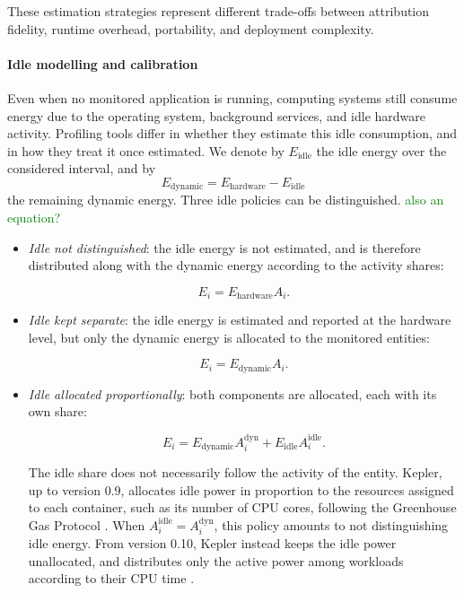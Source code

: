 \documentclass[
  acmsmall,
  screen,
  review,
  xcolor={dvipsnames,usenames}
]{acmart}
\newcommand{\iness}[1]{\textcolor{green}{#1}}
\begin{document}
These estimation strategies represent different trade-offs between attribution fidelity, runtime overhead, portability, and deployment complexity.

\paragraph{\textbf{Idle modelling and calibration}} \label{sec:idle-modelling}

Even when no monitored application is running, computing systems still consume energy due to the operating system, background services, and idle hardware activity. Profiling tools differ in whether they estimate this idle consumption, and in how they treat it once estimated. We denote by $E_{\mathrm{idle}}$ the idle energy over the considered interval, and by
\[
E_{\mathrm{dynamic}} = E_{\mathrm{hardware}} - E_{\mathrm{idle}}
\]
the remaining dynamic energy. Three idle policies can be distinguished.
\iness{also an equation?}
\begin{itemize}

\item \emph{Idle not distinguished}: the idle energy is not estimated, and is therefore distributed along with the dynamic energy according to the activity shares:

\begin{equation}
E_i = E_{\mathrm{hardware}} A_i.
\end{equation}

\item \emph{Idle kept separate}: the idle energy is estimated and reported at the hardware level, but only the dynamic energy is allocated to the monitored entities:

\begin{equation}
E_i = E_{\mathrm{dynamic}} A_i.
\end{equation}

\item \emph{Idle allocated proportionally}: both components are allocated, each with its own share:

\begin{equation}
E_i =
E_{\mathrm{dynamic}}A_i^{\mathrm{dyn}}
+
E_{\mathrm{idle}}A_i^{\mathrm{idle}}.
\end{equation}

The idle share does not necessarily follow the activity of the entity. Kepler, up to version 0.9, allocates idle power in proportion to the resources assigned to each container, such as its number of CPU cores, following the Greenhouse Gas Protocol \cite{cncfExploringKeplersPotentials2023,bellalInvestigatingPotentialKepler}. When $A_i^{\mathrm{idle}} = A_i^{\mathrm{dyn}}$, this policy amounts to not distinguishing idle energy. From version 0.10, Kepler instead keeps the idle power unallocated, and distributes only the active power among workloads according to their CPU time \cite{PowerAttributionKepler}.
\end{itemize}
\end{document}
